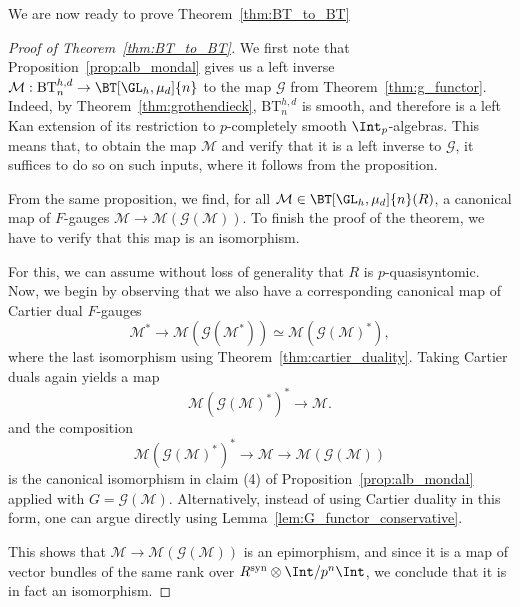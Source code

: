 \documentclass[10pt]{amsart}
\begin{document}
We are now ready to prove Theorem~\ref{thm:BT_to_BT}
\begin{proof}
[Proof of Theorem~\ref{thm:BT_to_BT}]
We first note that Proposition~\ref{prop:alb_mondal} gives us a left inverse $\mathcal{M}:\mathrm{BT}_n^{h,d}\to \BT[\GL_h,\mu_d]{n}$ to the map $\mathcal{G}$ from Theorem~\ref{thm:g_functor}. Indeed, by Theorem~\ref{thm:grothendieck}, $\mathrm{BT}_n^{h,d}$ is smooth, and therefore is a left Kan extension of its restriction to $p$-completely smooth $\Int_p$-algebras. This means that, to obtain the map $\mathcal{M}$ and verify that it is a left inverse to $\mathcal{G}$, it suffices to do so on such inputs, where it follows from the proposition.


From the same proposition, we find, for all $\mathcal{M}\in \BT[\GL_h,\mu_d]{n}(R)$, a canonical map of $F$-gauges $\mathcal{M}\to \mathcal{M}(\mathcal{G}(\mathcal{M}))$. To finish the proof of the theorem, we have to verify that this map is an isomorphism. 

For this, we can assume without loss of generality that $R$ is $p$-quasisyntomic. Now, we begin by observing that we also have a corresponding canonical map of Cartier dual $F$-gauges 
\[
\mathcal{M}^*\to \mathcal{M}(\mathcal{G}(\mathcal{M}^*))\simeq \mathcal{M}(\mathcal{G}(\mathcal{M})^*), 
\]
where the last isomorphism using Theorem~\ref{thm:cartier_duality}. Taking Cartier duals again yields a map
\[
\mathcal{M}(\mathcal{G}(\mathcal{M})^*)^* \to \mathcal{M}.
\]
and the composition
\[
\mathcal{M}(\mathcal{G}(\mathcal{M})^*)^*\to \mathcal{M}\to \mathcal{M}(\mathcal{G}(\mathcal{M}))
\]
is the canonical isomorphism in claim (4) of Proposition~\ref{prop:alb_mondal} applied with $G = \mathcal{G}(\mathcal{M})$. Alternatively, instead of using Cartier duality in this form, one can argue directly using Lemma~\ref{lem:G_functor_conservative}.

This shows that $\mathcal{M}\to \mathcal{M}(\mathcal{G}(\mathcal{M}))$ is an epimorphism, and since it is a map of vector bundles of the same rank over $R^{\mathrm{syn}}\otimes\Int/p^n\Int$, we conclude that it is in fact an isomorphism. 
\end{proof}
\end{document}
